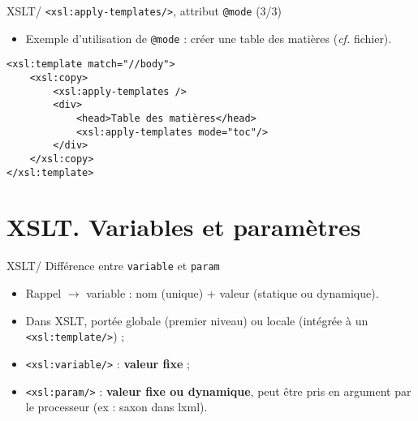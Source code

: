 \documentclass{beamer}
\begin{document}
    \begin{frame}[fragile]{XSLT/ \texttt{<xsl:apply-templates/>}, attribut \texttt{@mode} (3/3)}
        \Large
        \begin{itemize}
            \item Exemple d'utilisation de \texttt{@mode} : créer une table des matières (\textit{cf.} fichier).
        \end{itemize}
        \normalsize
        \begin{verbatim}
<xsl:template match="//body">
    <xsl:copy>
        <xsl:apply-templates />
        <div>
            <head>Table des matières</head>
            <xsl:apply-templates mode="toc"/>
        </div>
    </xsl:copy>
</xsl:template>
        \end{verbatim}
    \end{frame}

    \section{XSLT. Variables et paramètres}

    \begin{frame}{XSLT/ Différence entre \texttt{variable} et \texttt{param}}
        \Large
        \begin{itemize}
            \item Rappel $\rightarrow$ variable : nom (unique) + valeur (statique ou dynamique).
            \bigskip
            \item Dans XSLT, portée globale (premier niveau) ou locale (intégrée à un \texttt{<xsl:template/>}) ;
            \bigskip
            \item \texttt{<xsl:variable/>} : \textbf{valeur fixe} ;
            \bigskip
            \item \texttt{<xsl:param/>} : \textbf{valeur fixe ou dynamique}, peut être pris en argument par le processeur (ex : saxon dans lxml).
        \end{itemize}
    \end{frame}
\end{document}
